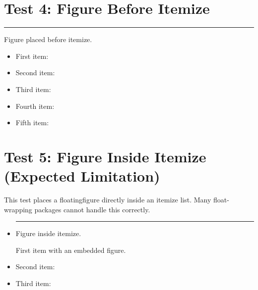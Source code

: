 \documentclass[a4paper,11pt]{article}
\begin{document}
\lipsum[5-8]

\section*{Test 4: Figure Before Itemize}

\begin{floatingfigure}[r]{0.35\textwidth}
  \centering
  \rule{0.3\textwidth}{4cm}
  \caption{Figure placed before itemize.}
  \label{fig:before-itemize}
\end{floatingfigure}

\lipsum[1][1-2]
\begin{itemize}
  \item First item: \lipsum[2][1-3]
  \item Second item: \lipsum[3][1-3]
  \item Third item: \lipsum[4][1-3]
  \item Fourth item: \lipsum[5][1-3]
  \item Fifth item: \lipsum[6][1-3]
\end{itemize}

\newpage

\section*{Test 5: Figure Inside Itemize (Expected Limitation)}
This test places a floatingfigure directly inside an itemize list.
Many float-wrapping packages cannot handle this correctly.

\begin{itemize}
\item
  \begin{floatingfigure}[r]{0.35\textwidth}
    \centering
    \rule{0.3\textwidth}{3cm}
    \caption{Figure inside itemize.}
    \label{fig:inside-itemize}
  \end{floatingfigure}
  First item with an embedded figure.
\item Second item: \lipsum[2][1-3]
  \item Third item: \lipsum[3][1-3]
\end{itemize}
\end{document}
